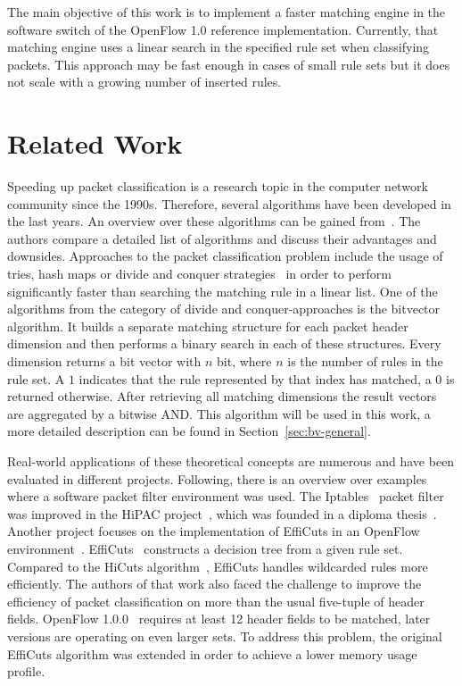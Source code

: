 \documentclass[a4paper,
		12pt,
		parskip=full,
		titlepage
		]{scrartcl}
\begin{document}
The main objective of this work is to implement a faster matching engine in the software switch of the OpenFlow 1.0 reference implementation.
Currently, that matching engine uses a linear search in the specified rule set when classifying packets.
This approach may be fast enough in cases of small rule sets but it does not scale
with a growing number of inserted rules.

\section{Related Work}
Speeding up packet classification is a research topic in the computer network community since the 1990s.
Therefore, several algorithms have been developed in the last years.
An overview over these algorithms can be gained from~\cite{algorithms_survey}.
The authors compare a detailed list of algorithms and discuss their advantages and downsides.
Approaches to the packet classification problem include the usage of tries, 
hash maps or divide and conquer strategies~\cite{hicuts, efficuts} in order to perform significantly 
faster than searching the matching rule in a linear list.
One of the algorithms from the category of divide and conquer-approaches is the bitvector~\cite{bv} algorithm.
It builds a separate matching structure for each packet header dimension and 
then performs a binary search in each of these structures.
Every dimension returns a bit vector with $n$ bit, where $n$ is the number of rules in the rule set.
A $1$ indicates that the rule represented by that index has matched, a $0$ is returned otherwise.
After retrieving all matching dimensions the result vectors are aggregated by a bitwise AND.
This algorithm will be used in this work, a more detailed description can be found in Section~\ref{sec:bv-general}.

Real-world applications of these theoretical concepts are numerous and have been evaluated in different projects.
Following, there is an overview over examples where a software packet filter environment was used.
The Iptables~\cite{iptables} packet filter was improved in the HiPAC project~\cite{hipac}, 
which was founded in a diploma thesis~\cite{heinzhigh}. %
Another project focuses on the implementation of EffiCuts in an OpenFlow environment~\cite{stimpfling2013optimal}.
EffiCuts~\cite{efficuts} constructs a decision tree from a given rule set.
Compared to the HiCuts algorithm~\cite{hicuts}, EffiCuts handles wildcarded rules more efficiently.
The authors of that work also faced the challenge to improve the efficiency 
of packet classification on more than the usual five-tuple of header fields.
OpenFlow 1.0.0~\cite{openflow_spec10} requires at least 12 header fields to be matched, later versions are operating on even larger sets.
To address this problem, the original EffiCuts algorithm was extended in order to achieve a lower memory usage profile.
\end{document}

